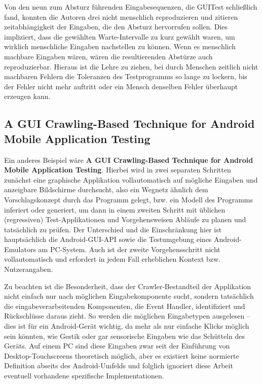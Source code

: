 Von den neun zum Absturz führenden Eingabesequenzen, die GUITest schließlich fand,
konnten die Autoren drei nicht menschlich reproduzieren und zitieren zeitabhängigkeit
der Eingaben, die den Absturz hervorrufen sollen. Dies impliziert, dass die gewählten Warte-Intervalle
zu kurz gewählt waren, um wirklich menschliche Eingaben nachstellen zu können. Wenn es
menschlich machbare Eingaben wären, wären die resultierenden Abstürze auch reproduzierbar.
Hieraus ist die Lehre zu ziehen, bei durch Menschen zeitlich nicht machbaren Fehlern die Toleranzen
des Testprogramms so lange zu lockern, bis der Fehler nicht mehr auftritt oder ein Mensch
denselben Fehler überhaupt erzeugen kann.


\subsection{A GUI Crawling-Based Technique for Android Mobile Application Testing}

Ein anderes Beispiel wäre \textbf{\glqq{}A GUI Crawling-Based Technique for Android Mobile Application
Testing\grqq{}}\cite{AGCBTFAMAT}. Hierbei wird in zwei separaten Schritten zunächst eine graphische Applikation
vollautomatisch auf mögliche Eingaben und anzeigbare Bildschirme durchsucht, also ein
\glqq{}Wegnetz\grqq{} ähnlich dem Vorschlagskonzept durch das Programm gelegt, bzw.
ein Modell des Programms inferiert oder generiert, um dann in einem zweiten
Schritt mit üblichen (regressiven) Test-Applikationen und Vorgehensweisen Abläufe zu
planen und tatsächlich zu prüfen. Der Unterschied und die Einschränkung hier ist
hauptsächlich die Android-GUI-API sowie die Testumgebung eines Android-Emulators am
PC-System. Auch ist der zweite Vorgehensschritt nicht vollautomatisch und erfordert in jedem Fall
erheblichen Kontext bzw. Nutzerangaben.

Zu beachten ist die Besonderheit, dass der Crawler-Bestandteil der Applikation nicht
einfach nur nach möglichen Eingabekomponente sucht, sondern tatsächlich die
eingabeverarbeitenden Komponenten, die \glqq{}Event Handler\grqq{}, identifiziert
und Rückschlüsse daraus zieht. So werden die möglichen Eingabetypen ausgelesen --
dies ist für ein Android-Gerät wichtig, da mehr als nur einfache \glqq{}Klicks\grqq{}
möglich sein könnten, wie Gestik oder gar sensorische Eingaben wie das Schütteln
des Geräts. Auf einem PC sind diese Eingaben zwar seit der Einführung von
Desktop-Touchscreens theoretisch möglich, aber es existiert keine normierte
Definition abseits des Android-Umfelds und folglich ignoriert diese Arbeit
eventuell vorhandene spezifische Implementationen.


